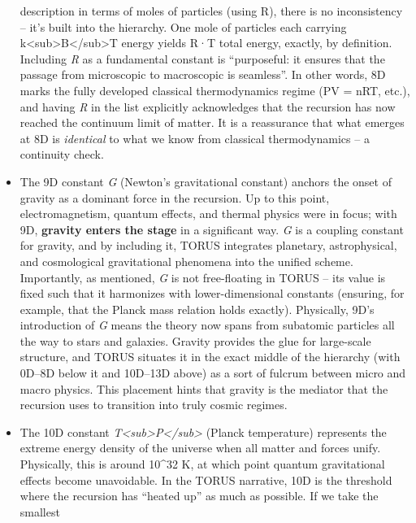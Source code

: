 \documentclass[
]{article}
\begin{document}
\begin{itemize}
  description in terms of moles of particles (using R), there is no
  inconsistency -- it's built into the hierarchy. One mole of particles
  each carrying k\textless sub\textgreater B\textless/sub\textgreater T
  energy yields R·T total energy, exactly, by definition. Including
  \emph{R} as a fundamental constant is ``purposeful: it ensures that
  the passage from microscopic to macroscopic is seamless''\hspace{0pt}.
  In other words, 8D marks the fully developed classical thermodynamics
  regime (PV = nRT, etc.), and having \emph{R} in the list explicitly
  acknowledges that the recursion has now reached the continuum limit of
  matter. It is a reassurance that what emerges at 8D is
  \emph{identical} to what we know from classical thermodynamics -- a
  continuity check.
\item
  The 9D constant \emph{G} (Newton's gravitational constant) anchors the
  onset of gravity as a dominant force in the recursion. Up to this
  point, electromagnetism, quantum effects, and thermal physics were in
  focus; with 9D, \textbf{gravity enters the stage} in a significant
  way. \emph{G} is a coupling constant for gravity, and by including it,
  TORUS integrates planetary, astrophysical, and cosmological
  gravitational phenomena into the unified scheme. Importantly, as
  mentioned, \emph{G} is not free-floating in TORUS -- its value is
  fixed such that it harmonizes with lower-dimensional constants
  (ensuring, for example, that the Planck mass relation holds
  exactly)\hspace{0pt}. Physically, 9D's introduction of \emph{G} means
  the theory now spans from subatomic particles all the way to stars and
  galaxies. Gravity provides the glue for large-scale structure, and
  TORUS situates it in the exact middle of the hierarchy (with 0D--8D
  below it and 10D--13D above) as a sort of fulcrum between micro and
  macro physics. This placement hints that gravity is the mediator that
  the recursion uses to transition into truly cosmic regimes.
\item
  The 10D constant
  \emph{T\textless sub\textgreater P\textless/sub\textgreater{}} (Planck
  temperature) represents the extreme energy density of the universe
  when all matter and forces unify. Physically, this is around 10\^{}32
  K, at which point quantum gravitational effects become unavoidable. In
  the TORUS narrative, 10D is the threshold where the recursion has
  ``heated up'' as much as possible\hspace{0pt}. If we take the smallest

\end{itemize}
\end{document}
